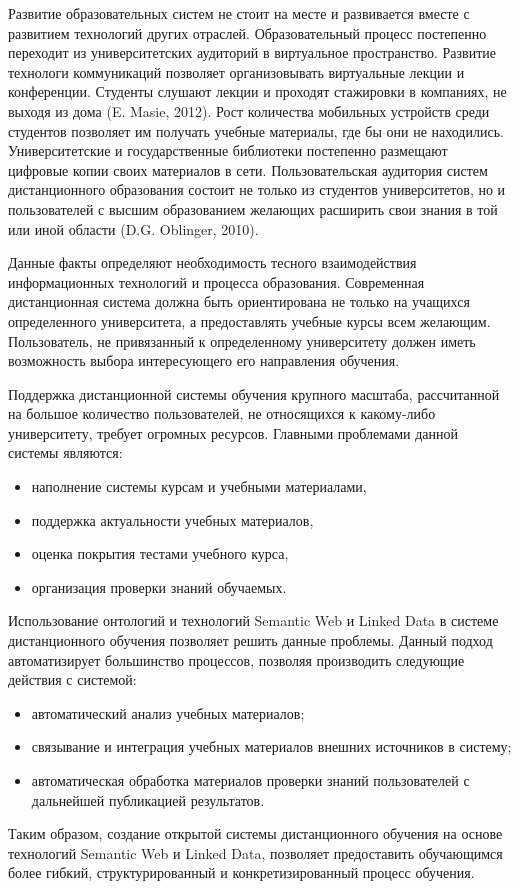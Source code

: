 Развитие образовательных систем не стоит на месте и развивается вместе с развитием технологий других отраслей. Образовательный процесс постепенно переходит из университетских аудиторий в виртуальное пространство. Развитие технологи коммуникаций позволяет организовывать виртуальные лекции и конференции. Студенты слушают лекции и проходят стажировки в компаниях, не выходя из дома (E. Masie, 2012). Рост количества мобильных устройств среди студентов позволяет им получать учебные материалы, где бы они не находились. Университетские и государственные библиотеки постепенно размещают цифровые копии своих материалов в сети. Пользовательская аудитория систем дистанционного образования состоит не только из студентов университетов, но и пользователей с высшим образованием желающих расширить свои знания в той или иной области (D.G. Oblinger, 2010). 

Данные факты определяют необходимость тесного взаимодействия информационных технологий и процесса образования. Современная дистанционная система должна быть ориентирована не только на учащихся определенного университета, а предоставлять учебные курсы всем желающим. Пользователь, не привязанный к определенному университету должен иметь возможность выбора интересующего его направления обучения. 

Поддержка дистанционной системы обучения крупного масштаба, рассчитанной на большое количество пользователей, не относящихся к какому-либо университету, требует огромных ресурсов. Главными проблемами данной системы являются: 

\begin{itemize}
\item наполнение системы курсам и учебными материалами,
\item поддержка актуальности учебных материалов, 
\item оценка покрытия тестами учебного курса,
\item организация проверки знаний обучаемых.
\end{itemize}

Использование онтологий и технологий Semantic Web и Linked Data в системе дистанционного обучения позволяет решить данные проблемы. Данный подход автоматизирует большинство процессов, позволяя производить следующие действия с системой:

\begin{itemize}
\item автоматический анализ учебных материалов;
\item связывание и интеграция учебных материалов внешних источников в систему;
\item автоматическая обработка материалов проверки знаний пользователей с дальнейшей публикацией результатов. 
\end{itemize}

Таким образом, создание открытой системы дистанционного обучения на основе технологий Semantic Web и Linked Data, позволяет предоставить обучающимся более гибкий, структурированный и конкретизированный процесс обучения. 


\clearpage
